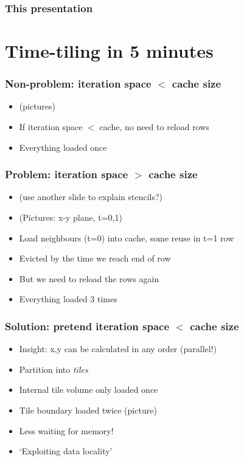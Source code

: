 \documentclass{beamer}
\begin{document}
\begin{frame}
\frametitle{This presentation}
\tableofcontents
\end{frame}



\section{Time-tiling in 5 minutes}

\begin{frame}
\frametitle{Non-problem: iteration space \(<\) cache size}

\begin{itemize}
	\item (pictures)
	\item If iteration space \(<\) cache, no need to reload rows
	\item Everything loaded once \Smiley
\end{itemize}
\end{frame}



\begin{frame}
\frametitle{Problem: iteration space \(>\) cache size}

\begin{itemize}
	\item (use another slide to explain stencils?)
	\item (Pictures: x-y plane, t=0,1)
	\item Load neighbours (t=0) into cache, some reuse in t=1 row
	\item Evicted by the time we reach end of row
	\item But we need to reload the rows again
	\item Everything loaded 3 times \Sadey
\end{itemize}
\end{frame}



\begin{frame}
\frametitle{Solution: pretend iteration space \(<\) cache size}

\begin{itemize}
	\item Insight: x,y can be calculated in any order (parallel!)
	\item Partition into \emph{tiles}
	\item Internal tile volume only loaded once
	\item Tile boundary loaded twice (picture)
	\item Less waiting for memory!
	\item `Exploiting data locality'
\end{itemize}
\end{frame}
\end{document}
